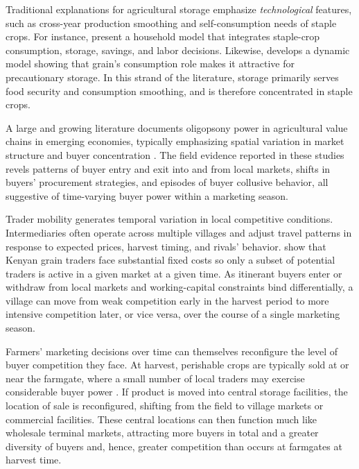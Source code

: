 Traditional explanations for agricultural storage emphasize \textit{technological} features, such as cross-year production smoothing and self-consumption needs of staple crops. For instance, \cite{saha1994household} present a household model that integrates staple-crop consumption, storage, savings, and labor decisions. Likewise, \cite{park2006risk} develops a dynamic model showing that grain's consumption role makes it attractive for precautionary storage. In this strand of the literature, storage primarily serves food security and consumption smoothing, and is therefore concentrated in staple crops.




\noindent A large and growing literature documents oligopsony power in agricultural value chains in emerging economies, typically emphasizing spatial variation in market structure and buyer concentration \citep{bergquist_dinerstein_2020, kopp2021farmers,macchiavello2021competition, rubens2023market}. The field evidence reported in these studies revels patterns of buyer entry and exit into and from local markets, shifts in buyers' procurement strategies, and episodes of buyer collusive behavior, all suggestive of time-varying buyer power within a marketing season.

Trader mobility generates temporal variation in local competitive conditions. Intermediaries often operate across multiple villages and adjust travel patterns in response to expected prices, harvest timing, and rivals' behavior. \citet{bergquist_dinerstein_2020} show that Kenyan grain traders face substantial fixed costs so only a subset of potential traders is active in a given market at a given time. As itinerant buyers enter or withdraw from local markets and working-capital constraints bind differentially, a village can move from weak competition early in the harvest period to more intensive competition later, or vice versa, over the course of a single marketing season.

Farmers' marketing decisions over time can themselves reconfigure the level of buyer competition they face. At harvest, perishable crops are typically sold at or near the farmgate, where a small number of local traders may exercise considerable buyer power \citep{Barrett_WD_1997, Kopp-Mishra}. If product is moved into central storage facilities, the location of sale is reconfigured, shifting from the field to village markets or commercial facilities. These central locations can then function much like wholesale terminal markets, attracting more buyers in total and a greater diversity of buyers and, hence, greater competition than occurs at farmgates at harvest time.

